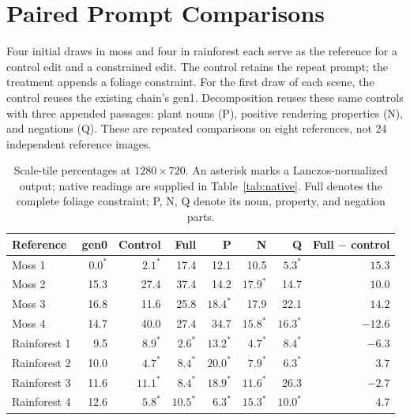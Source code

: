 \documentclass[sigplan,10pt,nonacm]{acmart}
\begin{document}
\section{Paired Prompt Comparisons}
\label{app:prompt}
Four initial draws in moss and four in rainforest each serve as the reference for a control edit and a constrained edit. The control retains the repeat prompt; the treatment appends a foliage constraint. For the first draw of each scene, the control reuses the existing chain's gen1. Decomposition reuses these same controls with three appended passages: plant nouns (P), positive rendering properties (N), and negations (Q). These are repeated comparisons on eight references, not 24 independent reference images.

\begin{table}[t]
\caption{Scale-tile percentages at $1280\times720$. An asterisk marks a Lanczos-normalized output; native readings are supplied in Table~\ref{tab:native}. Full denotes the complete foliage constraint; P, N, Q denote its noun, property, and negation parts.}
\label{tab:paired}
\centering\small
\begin{tabular}{lrrrrrrr}
\toprule
Reference & gen0 & Control & Full & P & N & Q & Full $-$ control \\
\midrule
Moss 1 & $0.0^*$ & $2.1^*$ & 17.4 & 12.1 & 10.5 & $5.3^*$ & $15.3$ \\
Moss 2 & 15.3 & 27.4 & 37.4 & 14.2 & $17.9^*$ & 14.7 & $10.0$ \\
Moss 3 & 16.8 & 11.6 & 25.8 & $18.4^*$ & 17.9 & 22.1 & $14.2$ \\
Moss 4 & 14.7 & 40.0 & 27.4 & 34.7 & $15.8^*$ & $16.3^*$ & $-12.6$ \\
Rainforest 1 & 9.5 & $8.9^*$ & $2.6^*$ & $13.2^*$ & $4.7^*$ & $8.4^*$ & $-6.3$ \\
Rainforest 2 & 10.0 & $4.7^*$ & $8.4^*$ & $20.0^*$ & $7.9^*$ & $6.3^*$ & $3.7$ \\
Rainforest 3 & 11.6 & $11.1^*$ & $8.4^*$ & $18.9^*$ & $11.6^*$ & 26.3 & $-2.7$ \\
Rainforest 4 & 12.6 & $5.8^*$ & $10.5^*$ & $6.3^*$ & $15.3^*$ & $10.0^*$ & $4.7$ \\
\bottomrule
\end{tabular}
\end{table}
\end{document}
